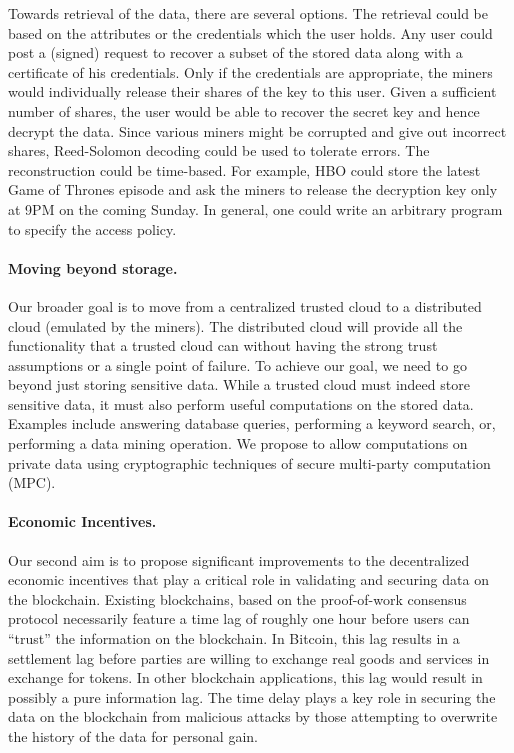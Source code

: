 \documentclass[runningheads, 12pt]{article}
\begin{document}
Towards retrieval of the data, there are several options. The retrieval could be based on the attributes or the credentials which the user holds. Any user could post a (signed) request to recover a subset of the stored data along with a certificate of his credentials. Only if the credentials are appropriate, the miners would individually release their shares of the key to this user. Given a sufficient number of shares, the user would be able to recover the secret key and hence decrypt the data. Since various miners might be corrupted and give out incorrect shares, Reed-Solomon decoding could be used to tolerate errors. The reconstruction could be time-based. For example, HBO could store the latest Game of Thrones episode and ask the miners to release the decryption key only at 9PM on the coming Sunday. In general, one could write an arbitrary program to specify the access policy.

\vspace{-5pt}
\paragraph{Moving beyond storage.} Our broader goal is to move from a centralized trusted cloud to a distributed cloud (emulated by the miners). The distributed cloud will provide all the functionality that a trusted cloud can without having the strong trust assumptions or a single point of failure.  To achieve our goal, we need to go beyond just storing sensitive data. While a trusted cloud must indeed store sensitive data, it must also perform useful computations on the stored data. Examples include answering database queries, performing a keyword search, or, performing a data mining operation. We propose to allow computations on private data using cryptographic techniques of secure multi-party computation (MPC).

\vspace{-5pt}
\paragraph{Economic Incentives.} Our second aim is to propose significant improvements to the decentralized economic incentives that play a critical role in validating and securing data on the blockchain. Existing blockchains, based on the proof-of-work consensus protocol necessarily feature a time lag of roughly one hour before users can ``trust'' the information on the blockchain. In Bitcoin, this lag results in a settlement lag before parties are willing to exchange real goods and services in exchange for tokens. In other blockchain applications, this lag would result in possibly a pure information lag. The time delay plays a key role in securing the data on the blockchain from malicious attacks by those attempting to overwrite the history of the data for personal gain.
\end{document}
